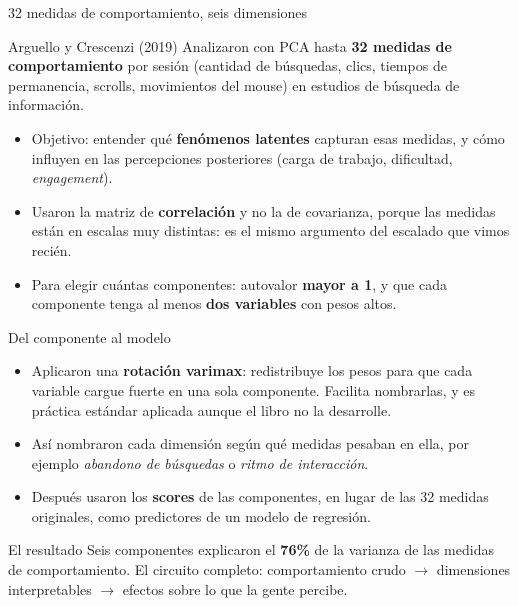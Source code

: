 \documentclass[aspectratio=169,xcolor=dvipsnames]{beamer}
\begin{document}
\begin{frame}{32 medidas de comportamiento, seis dimensiones}
    \begin{block}{Arguello y Crescenzi (2019)}
        Analizaron con PCA hasta \textbf{32 medidas de comportamiento} por sesi\'on (cantidad de b\'usquedas, clics, tiempos de permanencia, scrolls, movimientos del mouse) en estudios de b\'usqueda de informaci\'on.
    \end{block}
    \begin{itemize}
        \item Objetivo: entender qu\'e \textbf{fen\'omenos latentes} capturan esas medidas, y c\'omo influyen en las percepciones posteriores (carga de trabajo, dificultad, \emph{engagement}).
        \item Usaron la matriz de \textbf{correlaci\'on} y no la de covarianza, porque las medidas est\'an en escalas muy distintas: es \alert{el mismo argumento del escalado} que vimos reci\'en.
        \item Para elegir cu\'antas componentes: autovalor \textbf{mayor a 1}, y que cada componente tenga al menos \textbf{dos variables} con pesos altos.
    \end{itemize}
\end{frame}

\begin{frame}{Del componente al modelo}
    \begin{itemize}
        \item Aplicaron una \textbf{rotaci\'on varimax}: redistribuye los pesos para que cada variable cargue fuerte en una sola componente. Facilita \alert{nombrarlas}, y es pr\'actica est\'andar aplicada aunque el libro no la desarrolle.
        \item As\'i nombraron cada dimensi\'on seg\'un qu\'e medidas pesaban en ella, por ejemplo \emph{abandono de b\'usquedas} o \emph{ritmo de interacci\'on}.
        \item Despu\'es usaron los \textbf{scores} de las componentes, en lugar de las 32 medidas originales, como predictores de un modelo de regresi\'on.
    \end{itemize}
    \vfill
    \begin{exampleblock}{El resultado}
        Seis componentes explicaron el \textbf{76\%} de la varianza de las medidas de comportamiento. El circuito completo: comportamiento crudo $\rightarrow$ dimensiones interpretables $\rightarrow$ efectos sobre lo que la gente percibe.
    \end{exampleblock}
\end{frame}
\end{document}
